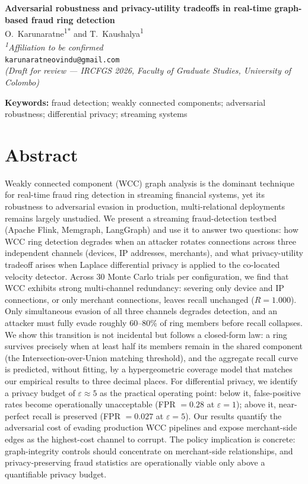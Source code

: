 \documentclass[12pt,a4paper]{article}
\begin{document}
\begin{center}
{\large\bfseries Adversarial robustness and privacy-utility tradeoffs in
real-time graph-based fraud ring detection}\\[8pt]
O.~Karunaratne\textsuperscript{1*} and T.~Kaushalya\textsuperscript{1}\\[4pt]
\textit{\textsuperscript{1}Affiliation to be confirmed}\\
\texttt{karunaratneovindu@gmail.com}\\[2pt]
{\small\textit{(Draft for review --- IRCFGS 2026, Faculty of Graduate Studies,
University of Colombo)}}
\end{center}

\vspace{6pt}
\textbf{Keywords:} fraud detection; weakly connected components; adversarial
robustness; differential privacy; streaming systems

\section*{Abstract}

Weakly connected component (WCC) graph analysis is the dominant technique for
real-time fraud ring detection in streaming financial systems, yet its
robustness to adversarial evasion in production, multi-relational deployments
remains largely unstudied. We present a streaming fraud-detection testbed
(Apache Flink, Memgraph, LangGraph) and use it to answer two questions: how WCC
ring detection degrades when an attacker rotates connections across three
independent channels (devices, IP addresses, merchants), and what
privacy-utility tradeoff arises when Laplace differential privacy is applied to
the co-located velocity detector. Across 30 Monte Carlo trials per
configuration, we find that WCC exhibits strong multi-channel redundancy:
severing only device and IP connections, or only merchant connections, leaves
recall unchanged ($R = 1.000$). Only simultaneous evasion of all three channels
degrades detection, and an attacker must fully evade roughly 60--80\% of ring
members before recall collapses. We show this transition is not incidental but
follows a closed-form law: a ring survives precisely when at least half its
members remain in the shared component (the Intersection-over-Union matching
threshold), and the aggregate recall curve is predicted, without fitting, by a
hypergeometric coverage model that matches our empirical results to three
decimal places. For differential privacy, we identify a privacy budget of
$\varepsilon \approx 5$ as the practical operating point: below it,
false-positive rates become operationally unacceptable (FPR $=0.28$ at
$\varepsilon=1$); above it, near-perfect recall is preserved (FPR $=0.027$ at
$\varepsilon=5$). Our results quantify the adversarial cost of evading
production WCC pipelines and expose merchant-side edges as the highest-cost
channel to corrupt. The policy implication is concrete: graph-integrity
controls should concentrate on merchant-side relationships, and
privacy-preserving fraud statistics are operationally viable only above a
quantifiable privacy budget.
\end{document}
